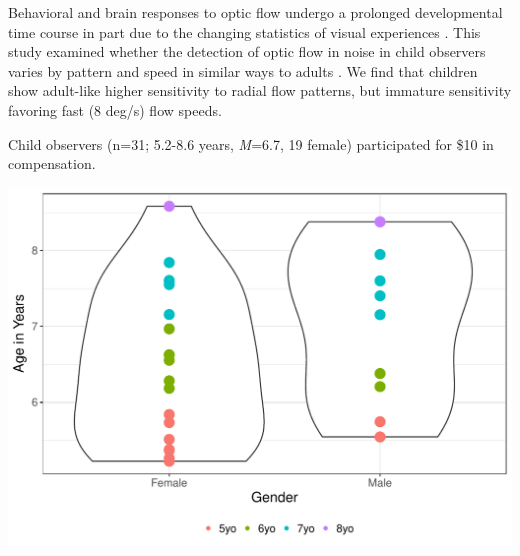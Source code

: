 \documentclass[landscape,final,paperwidth=60in,paperheight=39in,fontscale=0.285]{baposter}
\begin{document}
\begin{poster}
%
    {
      Behavioral and brain responses to optic flow undergo a prolonged developmental time course \cite{gilmore_childrens_2016, fesi_cortical_2014} in part due to the changing statistics of visual experiences \cite{gilmore_what_2015,raudies_visual_2014}. This study examined whether the detection of optic flow in noise in child observers varies by pattern and speed in similar ways to adults \cite{adamiak_adult_2015}. We find that children show adult-like higher sensitivity to radial flow patterns, but immature sensitivity favoring fast (8 deg/s) flow speeds.
    }
    {
\par Child observers (n=31; 5.2-8.6 years, \emph{M}=6.7, 19 female) participated for \$10 in compensation. 
\begin{center}
\includegraphics[scale=0.4]{img/age-sex-violin-1.pdf}

\end{center}}
\end{poster}
\end{document}

